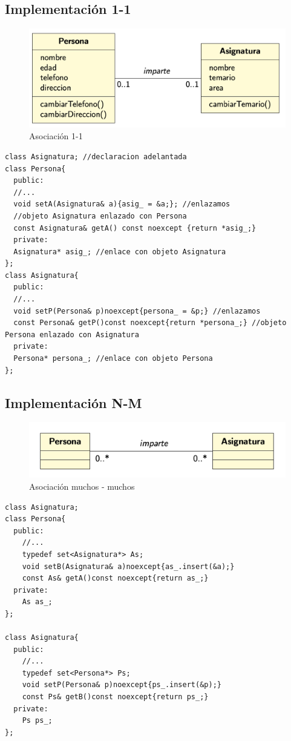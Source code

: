 \subsection{Implementación 1-1}

\begin{figure}[h]
    \centering
	\includegraphics[width=\textwidth]{Imagenes/asociacion1.png}
    \caption{Asociación 1-1}
\end{figure}
\begin{center}
	\begin{lstlisting}[frame=single]
class Asignatura; //declaracion adelantada
class Persona{
  public:
  //...
  void setA(Asignatura& a){asig_ = &a;}; //enlazamos   
  //objeto Asignatura enlazado con Persona
  const Asignatura& getA() const noexcept {return *asig_;} 
  private:
  Asignatura* asig_; //enlace con objeto Asignatura
};
class Asignatura{
  public:
  //...
  void setP(Persona& p)noexcept{persona_ = &p;} //enlazamos
  const Persona& getP()const noexcept{return *persona_;} //objeto Persona enlazado con Asignatura
  private:
  Persona* persona_; //enlace con objeto Persona
};
\end{lstlisting}
\end{center}


\newpage
\subsection{Implementación N-M}
\begin{figure}[h]
    \centering
    \includegraphics[width=\textwidth]{Imagenes/asociacion2.png}
    \caption{Asociación muchos - muchos}
\end{figure}

\begin{center}
	\begin{lstlisting}[frame=single]
class Asignatura;
class Persona{
  public:
    //...
    typedef set<Asignatura*> As;
    void setB(Asignatura& a)noexcept{as_.insert(&a);}
    const As& getA()const noexcept{return as_;}
  private:
    As as_;   
};

class Asignatura{
  public:
    //...
    typedef set<Persona*> Ps;
    void setP(Persona& p)noexcept{ps_.insert(&p);}
    const Ps& getB()const noexcept{return ps_;}
  private:
    Ps ps_;
};
\end{lstlisting}
\end{center}

